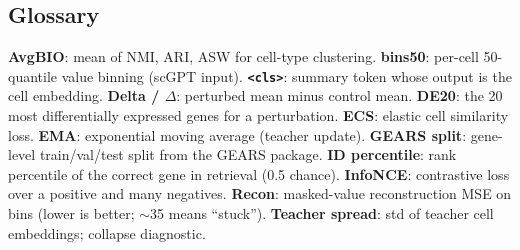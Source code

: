 \documentclass[11pt]{article}
\newcommand{\code}[1]{\texttt{\small #1}}
\begin{document}
\subsection*{Glossary}
\small
\textbf{AvgBIO}: mean of NMI, ARI, ASW for cell-type clustering. \textbf{bins50}: per-cell 50-quantile value binning (scGPT input). \textbf{\code{<cls>}}: summary token whose output is the cell embedding. \textbf{Delta / $\Delta$}: perturbed mean minus control mean. \textbf{DE20}: the 20 most differentially expressed genes for a perturbation. \textbf{ECS}: elastic cell similarity loss. \textbf{EMA}: exponential moving average (teacher update). \textbf{GEARS split}: gene-level train/val/test split from the GEARS package. \textbf{ID percentile}: rank percentile of the correct gene in retrieval (0.5 chance). \textbf{InfoNCE}: contrastive loss over a positive and many negatives. \textbf{Recon}: masked-value reconstruction MSE on bins (lower is better; $\sim$35 means ``stuck''). \textbf{Teacher spread}: std of teacher cell embeddings; collapse diagnostic.
\end{document}
